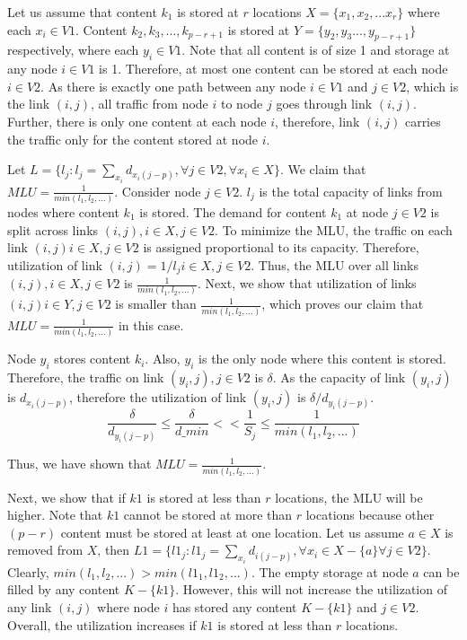 {\eat
{
Let us assume that content $k_1$ is stored at $r$ locations $X =\{ x_{1}, x_{2}, ... x_{r} \}$ where each $x_{i} \in V1$. Content $k_2, k_3, ..., k_{p - r +1}$ is stored at $Y =\{  y_2, y_3 ..., y_{p - r + 1}\}$ respectively, where each $y_i \in V1$. Note that all content is of size 1 and storage at any node $i \in V1$ is 1. Therefore, at most one content can be stored at each node $i \in V2$. As there is exactly one path between any node $i \in V1$ and  $j \in V2$, which is the link $(i, j)$, all traffic from node $i$ to node $j$ goes through link $(i, j)$. Further, there is only one content at each node $i$, therefore, link $(i, j)$ carries the traffic only for the content stored at node $i$.
}


Let $L = \{l_j :   l_j = \sum_{x_i}  d_{x_i(j - p)}, \forall j \in V2, \forall x_i \in X\}$. We claim that $\textit{MLU} = \frac{1}{\textit{min} (l_1, l_2, ... )}$.  Consider node $j \in V2$. $l_j$ is the total capacity of links from nodes where content $k_1$ is stored. The  demand for content $k_1$ at node $j \in V2$ is split across links $(i, j), i \in X, j \in V2$. To minimize the MLU, the traffic on each link $(i, j)  i \in X, j \in V2 $ is assigned proportional to its capacity. Therefore, utilization of link $(i, j)  = 1/l_j  i \in X, j \in V2$. Thus, the MLU over all links $(i, j),  i \in X, j \in V2 $ is $\frac{1}{\textit{min} (l_1, l_2, ... )}$.  Next, we show that  utilization of links $(i, j) i \in Y, j \in V2$ is smaller than $\frac{1}{\textit{min} (l_1, l_2, ... )}$, which proves our claim that $\textit{MLU} = \frac{1}{\textit{min} (l_1, l_2, ... )}$ in this case.


Node $y_i$ stores content $k_{i}$. Also, $y_i$ is the only node where this content is stored. Therefore, the traffic on link $(y_i, j), j \in V2$  is $\delta$. As the capacity of link $(y_i, j)$ is $d_{x_{i}(j - p)}$, therefore the utilization of link $(y_i, j)$ is $\delta/d_{y_i(j - p)}$. 
\[\frac{\delta}{d_{y_i(j - p)}} \leq \frac{\delta}{d\_min} << \frac{1}{S_j}  \leq \frac{1}{\textit{min} (l_1, l_2, ... )}\]

Thus, we have shown that $\textit{MLU} = \frac{1}{\textit{min} (l_1, l_2, ... )}$.

Next, we show that if $k1$ is stored at less than $r$ locations, the MLU will be higher. Note that  $k1$ cannot be stored at more than $r$ locations because other $(p - r)$ content must be stored at least at one location. Let us assume  $a \in X$  is removed from $X$, then $L1 = \{l1_j :  l1_j = \sum_{x_i}  d_{i(j - p)}, \forall x_i \in X - \{a\} \forall j \in V2\}$. Clearly, $\textit{min} (l_1, l_2, ... ) > \textit{min} (l1_1, l1_2, ... )$. The empty storage at node $a$ can be filled by any content $K - \{k1\}$.  However, this will not increase the utilization of any link $(i, j)$ where node $i$ has stored any content $K - \{k1\}$ and $j \in V2$. Overall, the utilization increases if $k1$ is stored at less than $r$ locations. 

}
